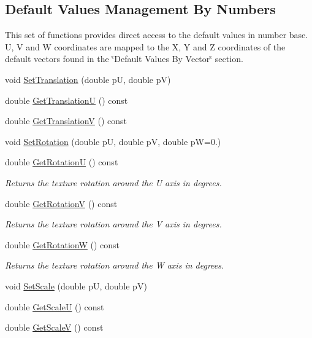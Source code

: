 \subsection*{Default Values Management By Numbers}
\label{_amgrp1bc37203c3d596c3e93e8acc55fbfc6d}%
This set of functions provides direct access to the default values in number base. U, V and W coordinates are mapped to the X, Y and Z coordinates of the default vectors found in the \char`\"{}\+Default Values By Vector\char`\"{} section. \begin{DoxyCompactItemize}
\item 
void \hyperlink{class_fbx_texture_aeeaecd1f6dbbe08fcf2e77b56a0e97f4}{Set\+Translation} (double pU, double pV)
\item 
double \hyperlink{class_fbx_texture_a7785949815ca2cdaa44af41f00c4a3bc}{Get\+TranslationU} () const
\item 
double \hyperlink{class_fbx_texture_a96e08939c1efcc3edbc7392a86fb6c43}{Get\+TranslationV} () const
\item 
void \hyperlink{class_fbx_texture_a2626c877d3bcbc16c74b8bb8a5dbd46d}{Set\+Rotation} (double pU, double pV, double pW=0.)
\item 
double \hyperlink{class_fbx_texture_a188819733b0abd2c91050393c036b982}{Get\+RotationU} () const
\begin{DoxyCompactList}\small\item\em Returns the texture rotation around the U axis in degrees. \end{DoxyCompactList}\item 
double \hyperlink{class_fbx_texture_a49b00097942d1664a04f39803d083406}{Get\+RotationV} () const
\begin{DoxyCompactList}\small\item\em Returns the texture rotation around the V axis in degrees. \end{DoxyCompactList}\item 
double \hyperlink{class_fbx_texture_a5f320c1d648dcf09323c7df39cfbb4c8}{Get\+RotationW} () const
\begin{DoxyCompactList}\small\item\em Returns the texture rotation around the W axis in degrees. \end{DoxyCompactList}\item 
void \hyperlink{class_fbx_texture_adade3b75698249b7e09e4044136ca49c}{Set\+Scale} (double pU, double pV)
\item 
double \hyperlink{class_fbx_texture_a2ca0428f36ddd73442891a73c15e4227}{Get\+ScaleU} () const
\item 
double \hyperlink{class_fbx_texture_a37edad25de26090cde868b88b9e89a77}{Get\+ScaleV} () const
\end{DoxyCompactItemize}

